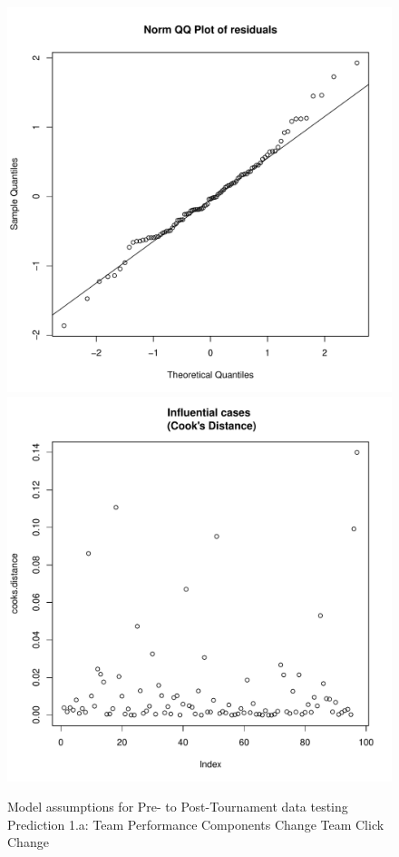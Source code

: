 \begin{CJK}{UTF8}{gbsn}
\begin{figure}[htbp]
   \includegraphics[scale =.4]{images/MLM21aQQNorm.pdf}
   \includegraphics[scale =.4]{images/MLM21aCooksD.pdf}
   \caption{Model assumptions for Pre- to Post-Tournament data testing Prediction 1.a: Team Performance Components Change Team Click Change}
   \label{fig:MLM21aAssumptions}
 \end{figure}



\end{CJK}
